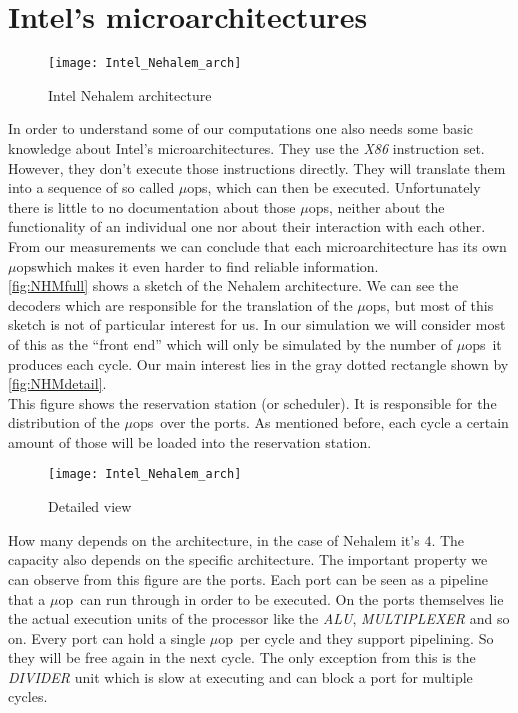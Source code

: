 \documentclass[a4paper,12pt,titlepage, twoside]{report}
\newcommand{\microop}{$\mu$op}
\newcommand{\microops}{$\mu$ops}
\begin{document}
\section{Intel's microarchitectures}


\begin{wrapfigure}[25]{l}{0.6\textwidth}
    \texttt{[image: Intel\_Nehalem\_arch]}
    \caption{Intel Nehalem architecture \cite{nehalem}}
    \label{fig:NHMfull}
\end{wrapfigure}


In order to understand some of our computations one also needs some basic knowledge about Intel's microarchitectures. They use the \emph{X86} instruction set. However, they don't execute those instructions directly. They will translate them into a sequence of so called \microops, which can then be executed. Unfortunately there is little to no documentation about those \microops, neither about the functionality of an individual one nor about their interaction with each other. From our measurements we can conclude that each microarchitecture has its own \microops which makes it even harder to find reliable information.\\ \autoref{fig:NHMfull} shows a sketch of the Nehalem architecture. We can see the decoders which are responsible for the translation of the \microops, but most of this sketch is not of particular interest for us. In our simulation we will consider most of this as the ``front end'' which will only be simulated by the number of \microops\ it produces each cycle. Our main interest lies in the gray dotted rectangle shown by \autoref{fig:NHMdetail}.\\
This figure shows the reservation station (or scheduler). It is responsible for the distribution of the \microops\ over the ports. As mentioned before, each cycle a certain amount of those will be loaded into the reservation station.


\begin{wrapfigure}[15]{r}{0.6\textwidth}
    \texttt{[image: Intel\_Nehalem\_arch]}
    \caption{Detailed view}
    \label{fig:NHMdetail}
\end{wrapfigure}

 How many depends on the architecture, in the case of Nehalem it's $4$. The capacity also depends on the specific architecture. The important property we can observe from this figure are the ports. Each port can be seen as a pipeline that a \microop\ can run through in order to be executed. On the ports themselves lie the actual execution units of the processor like the \emph{ALU}, \emph{MULTIPLEXER} and so on. Every port can hold a single \microop\ per cycle and they support pipelining. So they will be free again in the next cycle. The only exception from this is the \emph{DIVIDER} unit which is slow at executing and can block a port for multiple cycles.
\end{document}
